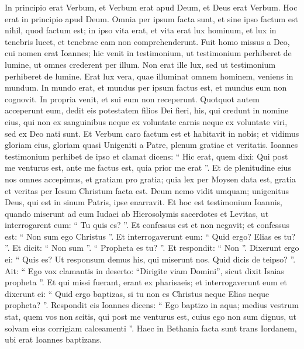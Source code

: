 \begin{biblechapter}
 \verse In principio erat Verbum, et Verbum erat apud Deum, et Deus erat Verbum. 
\verse Hoc erat in principio apud Deum. 
\verse Omnia per ipsum facta sunt, et sine ipso factum est nihil, quod factum est; 
\verse in ipso vita erat, et vita erat lux hominum, 
\verse et lux in tenebris lucet, et tenebrae eam non comprehenderunt.
 \verse Fuit homo missus a Deo, cui nomen erat Ioannes; 
\verse hic venit in testimonium, ut testimonium perhiberet de lumine, ut omnes crederent per illum. 
 \verse Non erat ille lux, sed ut testimonium perhiberet de lumine.
 \verse Erat lux vera, quae illuminat omnem hominem, veniens in mundum. 
\verse In mundo erat, et mundus per ipsum factus est, et mundus eum non cognovit. 
\verse In propria venit, et sui eum non receperunt.
 \verse Quotquot autem acceperunt eum, dedit eis potestatem filios Dei fieri, his, qui credunt in nomine eius, 
\verse qui non ex sanguinibus neque ex voluntate carnis neque ex voluntate viri, sed ex Deo nati sunt.
 \verse Et Verbum caro factum est et habitavit in nobis; et vidimus gloriam eius, gloriam quasi Unigeniti a Patre, plenum gratiae et veritatis.
 \verse Ioannes testimonium perhibet de ipso et clamat dicens: “ Hic erat, quem dixi: Qui post me venturus est, ante me factus est, quia prior me erat ”.
 \verse Et de plenitudine eius nos omnes accepimus, et gratiam pro gratia; 
\verse quia lex per Moysen data est, gratia et veritas per Iesum Christum facta est. 
 \verse Deum nemo vidit umquam; unigenitus Deus, qui est in sinum Patris, ipse enarravit.
 \verse Et hoc est testimonium Ioannis, quando miserunt ad eum Iudaei ab Hierosolymis sacerdotes et Levitas, ut interrogarent eum: “ Tu quis es? ”. 
\verse Et confessus est et non negavit; et confessus est: “ Non sum ego Christus ”. 
\verse Et interrogaverunt eum: “ Quid ergo? Elias es tu? ”. Et dicit: “ Non sum ”. “ Propheta es tu? ”. Et respondit: “ Non ”. 
\verse Dixerunt ergo ei: “ Quis es? Ut responsum demus his, qui miserunt nos. Quid dicis de teipso? ”. 
\verse Ait:
 “ Ego vox clamantis in deserto:
 “Dirigite viam Domini”,
 sicut dixit Isaias propheta ”. 
\verse Et qui missi fuerant, erant ex pharisaeis; 
\verse et interrogaverunt eum et dixerunt ei: “ Quid ergo baptizas, si tu non es Christus neque Elias neque propheta? ”. 
\verse Respondit eis Ioannes dicens: “ Ego baptizo in aqua; medius vestrum stat, quem vos non scitis, 
\verse qui post me venturus est, cuius ego non sum dignus, ut solvam eius corrigiam calceamenti ”. 
\verse Haec in Bethania facta sunt trans Iordanem, ubi erat Ioannes baptizans.

\end{biblechapter}
